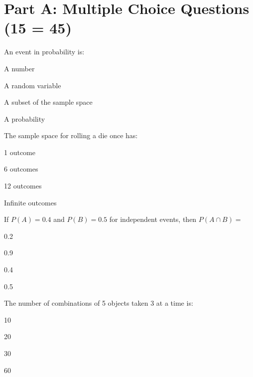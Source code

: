 \documentclass{CWNUExam}
\begin{document}
\maketitle

\section{Part A: Multiple Choice Questions (15  = 45)}

\begin{question}
An event in probability is:
\paren
\begin{choices}
\item A number
\item A random variable
\item A subset of the sample space
\item A probability
\end{choices}
\end{question}

\begin{question}
The sample space for rolling a die once has:
\paren
\begin{choices}
\item 1 outcome
\item 6 outcomes
\item 12 outcomes
\item Infinite outcomes
\end{choices}
\end{question}

\begin{question}
If $P(A)=0.4$ and $P(B)=0.5$ for independent events, then $P(A\cap B)=$
\paren
\begin{choices}
\item 0.2
\item 0.9
\item 0.4
\item 0.5
\end{choices}
\end{question}

\begin{question}
The number of combinations of 5 objects taken 3 at a time is:
\paren
\begin{choices}
\item 10
\item 20
\item 30
\item 60
\end{choices}
\end{question}
\end{document}
